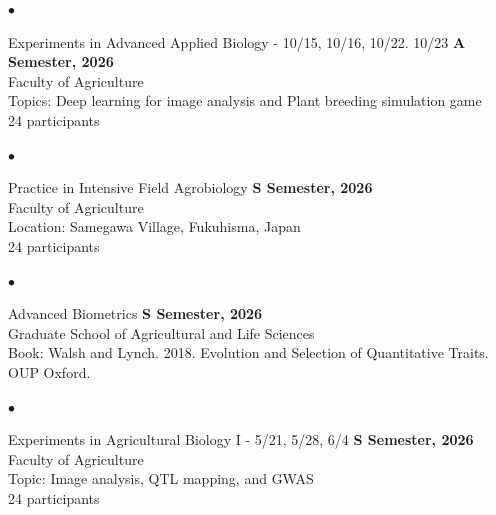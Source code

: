 \documentclass[margin,line,10pt]{res}
\newenvironment{list2}{
  \begin{list}{$\bullet$}{%
      \setlength{\itemsep}{0in}
      \setlength{\parsep}{0in} \setlength{\parskip}{0in}
      \setlength{\topsep}{0in} \setlength{\partopsep}{0in} 
      \setlength{\leftmargin}{0.2in}}}{\end{list}}
\begin{document}
\begin{resume}
\vspace{0.4cm}



\begin{list2}
  \item Experiments in Advanced Applied Biology - 10/15, 10/16, 10/22. 10/23 \hfill {\bf A Semester, 2026} \\ %
  Faculty of Agriculture \\ %
  Topics: Deep learning for image analysis and Plant breeding simulation game \\
  24  participants 
\end{list2}

 
\vspace{0.4cm}


\begin{list2}
  \item Practice in Intensive Field Agrobiology \hfill {\bf S Semester, 2026} \\ %
  Faculty of Agriculture \\ %
  Location: Samegawa Village, Fukuhisma, Japan \\
  24  participants 
\end{list2}


\vspace{0.4cm}

\begin{list2}
  \item Advanced Biometrics  \hfill {\bf S Semester, 2026} \\  %
  Graduate School of Agricultural and Life Sciences \\ %
  Book: Walsh and Lynch. 2018. Evolution and Selection of Quantitative Traits. OUP Oxford. 
 \end{list2}
 
 \vspace{0.4cm}



\begin{list2}
  \item Experiments in Agricultural Biology I - 5/21, 5/28, 6/4 \hfill {\bf S Semester, 2026} \\ %
  Faculty of Agriculture \\ %
  Topic: Image analysis, QTL mapping, and GWAS \\
  24  participants 
\end{list2}




\end{resume}
\end{document}
